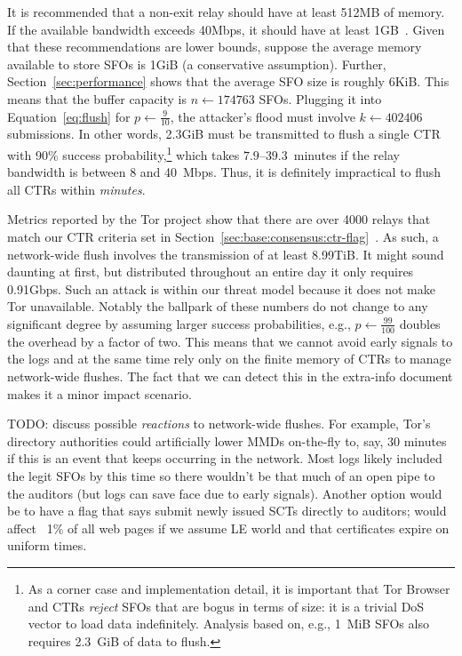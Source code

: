 It is recommended that a non-exit relay should have at least 512MB of memory.
If the available bandwidth exceeds 40Mbps, it should have at least
1GB~\cite{relay-config}.  Given that these recommendations are lower bounds,
suppose the average memory available to store SFOs is 1GiB (a conservative
assumption).  Further, Section~\ref{sec:performance} shows that the average SFO
size is roughly 6KiB.  This means that the buffer capacity is $n \gets 174763$
SFOs. Plugging it into Equation~\ref{eq:flush} for $p \gets
\frac{9}{10}$, the attacker's flood must involve $k \gets 402406$ submissions.
In other words, 2.3GiB must be transmitted to flush a single CTR with 90\%
success probability,\footnote{%
	As a corner case and implementation detail, it is important that Tor Browser
	and CTRs \emph{reject} SFOs that are bogus in terms of size: it is a trivial
	DoS vector to load data indefinitely. Analysis based on, e.g., 1~MiB SFOs
	also requires 2.3~GiB of data to flush.
} which takes $7.9$--$39.3$~minutes if the relay bandwidth is between 8 and
40~Mbps.  Thus, it is definitely impractical to flush all CTRs within
\emph{minutes}.

Metrics reported by the Tor project show that there are over 4000 relays that
match our CTR criteria set in
Section~\ref{sec:base:consensus:ctr-flag}~\cite{relay-by-flag}.  As such, a
network-wide flush involves the transmission of at least 8.99TiB.  It might
sound daunting at first, but distributed throughout an entire day it only
requires 0.91Gbps.  Such an attack is within our threat model because it does
not make Tor unavailable.  Notably the ballpark of these numbers do not
change to any significant degree by assuming larger success probabilities, e.g.,
$p\gets\frac{99}{100}$ doubles the overhead by a factor of two.  This means
that we cannot avoid early signals to the logs and at the same time rely only on
the finite memory of CTRs to manage network-wide flushes.  The fact that we can
detect this in the extra-info document makes it a minor impact scenario.

TODO: discuss possible \emph{reactions} to network-wide flushes.  For example,
Tor's directory authorities could artificially lower MMDs on-the-fly to, say, 30
minutes if this is an event that keeps occurring in the network.  Most logs
likely included the legit SFOs by this time so there wouldn't be that much of an
open pipe to the auditors (but logs can save face due to early signals).
Another option would be to have a flag that says submit newly issued SCTs
directly to auditors; would affect ~1\% of all web pages if we assume LE world
and that certificates expire on uniform times.

